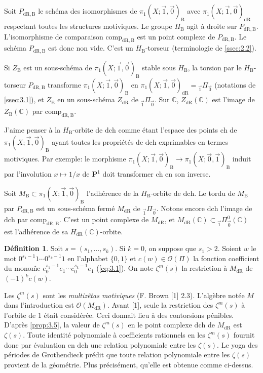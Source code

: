 \documentclass[11pt,a4paper]{article}
\theoremstyle{plain}
\theoremstyle{definition}
\newtheorem{definition}[theorem]{D\'efinition}
\newcommand{\C}{\mathbb{C}}
\newcommand{\dR}{\mathrm{dR}}
\newcommand{\B}{\mathrm{B}}
\newcommand{\comp}{\mathrm{comp}}
\begin{document}
\subsection{}\label{ssec:4.2}

Soit $P_{\dR,\B}$ le sch\'ema des isomorphismes de $\pi_1(X;\vec{1},\vec{0})_{\B}$ avec $\pi_1(X;\vec{1},\vec{0})_{\dR}$ respectant toutes les structures motiviques. Le groupe $H_{\B}$ agit \`a droite sur $P_{\dR,\B}$. L'isomorphisme de comparaison $\comp_{\dR,\B}$ est un point complexe de $P_{\dR,\B}$. Le sch\'ema $P_{\dR,\B}$ est donc non vide. C'est un $H_{\B}$-torseur (terminologie de \ref{ssec:2.2}).

Si $Z_{\B}$ est un sous-sch\'ema de $\pi_1(X;\vec{1},\vec{0})_{\B}$ stable sous $H_{\B}$, la torsion par le $H_{\B}$-torseur $P_{\dR,\B}$ transforme $\pi_1(X;\vec{1},\vec{0})_{\B}$ en $\pi_1(X;\vec{1},\vec{0})_{\dR} = {}_{\vec{1}}\Pi_{\vec{0}}$ (notations de \ref{ssec:3.1}), et $Z_{\B}$ en un sous-sch\'ema $Z_{\dR}$ de ${}_{\vec{1}}\Pi_{\vec{0}}$. Sur $\C$, $Z_{\dR}(\C)$ est l'image de $Z_{\B}(\C)$ par $\comp_{\dR,\B}$.

J'aime penser \`a la $H_{\B}$-orbite de $\mathrm{dch}$ comme \'etant l'espace des points $\mathrm{ch}$ de $\pi_1(X;\vec{1},\vec{0})_{\B}$ ayant toutes les propri\'et\'es de $\mathrm{dch}$ exprimables en termes motiviques. Par exemple: le morphisme $\pi_1(X;\vec{1},\vec{0})_{\B} \to \pi_1(X;\vec{0},\vec{1})_{\B}$ induit par l'involution $x \mapsto 1/x$ de $\mathbf{P}^1$ doit transformer $\mathrm{ch}$ en son inverse.

Soit $M_{\B} \subset \pi_1(X;\vec{1},\vec{0})_{\B}$ l'adh\'erence de la $H_{\B}$-orbite de $\mathrm{dch}$. Le tordu de $M_{\B}$ par $P_{\dR,\B}$ est un sous-sch\'ema ferm\'e $M_{\dR}$ de ${}_{\vec{1}}\Pi_{\vec{0}}$. Notons encore $\mathrm{dch}$ l'image de $\mathrm{dch}$ par $\comp_{\dR,\B}$. C'est un point complexe de $M_{\dR}$, et $M_{\dR}(\C) \subset {}_{\vec{1}}\Pi^0_{\vec{0}}(\C)$ est l'adh\'erence de sa $H_{\dR}(\C)$-orbite.

\begin{definition}\label{def:4.3}
Soit $s = (s_1,\ldots,s_k)$. Si $k = 0$, on suppose que $s_1 > 2$. Soient $w$ le mot $0^{s_1-1} 1 \cdots 0^{s_k-1} 1$ en l'alphabet $\{0,1\}$ et $c(w) \in \mathcal{O}(\Pi)$ la fonction coefficient du mono\^me $e_0^{s_1-1} e_1 \cdots e_0^{s_k-1} e_1$ (\ref{eq:3.1}). On note $\zeta^m(s)$ la restriction \`a $M_{\dR}$ de $(-1)^k c(w)$.
\end{definition}

Les $\zeta^m(s)$ sont les \emph{multiz\^etas motiviques} (F. Brown [1] 2.3). L'alg\`ebre not\'ee $M$ dans l'introduction est $\mathcal{O}(M_{\dR})$. Avant [1], seule la restriction des $\zeta^m(s)$ \`a l'orbite de $1$ \'etait consid\'er\'ee. Ceci donnait lieu \`a des contorsions p\'enibles. D'apr\`es \ref{prop:3.5}, la valeur de $\zeta^m(s)$ en le point complexe $\mathrm{dch}$ de $M_{\dR}$ est $\zeta(s)$. Toute identit\'e polynomiale \`a coefficients rationnels en les $\zeta^m(s)$ fournit donc par \'evaluation en $\mathrm{dch}$ une relation polynomiale entre les $\zeta(s)$. Le yoga des p\'eriodes de Grothendieck pr\'edit que toute relation polynomiale entre les $\zeta(s)$ provient de la g\'eom\'etrie. Plus pr\'ecis\'ement, qu'elle est obtenue comme ci-dessus.
\end{document}
